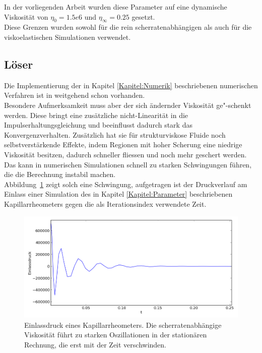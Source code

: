 In der vorliegenden Arbeit wurden diese Parameter auf eine dynamische Viskosität von $\eta_0=1.5e6$ und $\eta_\infty=0.25$ gesetzt.\\
Diese Grenzen wurden sowohl für die rein scherratenabhängigen als auch für die viskoelastischen Simulationen verwendet.

\subsection{Löser}
Die Implementierung der in Kapitel \ref{Kapitel:Numerik} beschriebenen numerischen Verfahren ist in \openfoam{} weitgehend schon vorhanden.\\
Besondere Aufmerksamkeit muss aber der sich ändernder Viskosität ge"-schenkt werden. Diese bringt eine zusätzliche nicht-Linearität in die Impulserhaltungsgleichung und beeinflusst dadurch stark das Konvergenzverhalten. Zusätzlich hat sie für strukturviskose Fluide noch selbstverstärkende Effekte, indem Regionen mit hoher Scherung eine niedrige Viskosität besitzen, dadurch schneller fliessen und noch mehr geschert werden. Das kann in numerischen Simulationen schnell zu starken Schwingungen führen, die die Berechnung instabil machen.\\
Abbildung~\ref{fig:oszPress} zeigt solch eine Schwingung, aufgetragen ist der Druckverlauf am Einlass einer Simulation des in Kapitel \ref{Kapitel:Parameter} beschriebenen Kapillarrheometers gegen die als Iterationsindex verwendete Zeit.
%
\begin{figure}
    \includegraphics[width=\textwidth]{figures/schwankenderDruck.png}
    \caption{Einlassdruck eines Kapillarrheometers. Die scherratenabhängige Viskosität führt zu starken Oszillationen in der stationären Rechnung, die erst mit der Zeit verschwinden.}
    \label{fig:oszPress}
\end{figure}
%

